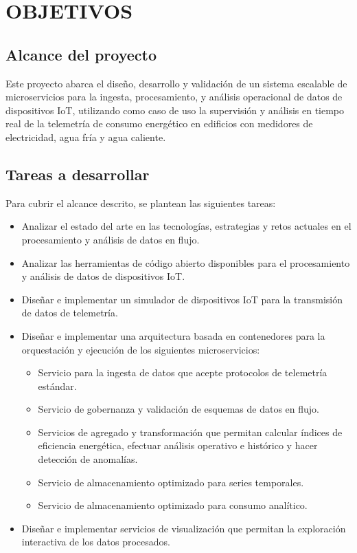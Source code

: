 \chapter{OBJETIVOS}

\section{Alcance del proyecto}

Este proyecto abarca el diseño, desarrollo y validación de un sistema escalable de microservicios para la ingesta, procesamiento, y análisis operacional de datos de dispositivos IoT, utilizando como caso de uso la supervisión y análisis en tiempo real de la telemetría de consumo energético en edificios con medidores de electricidad, agua fría y agua caliente.

\section{Tareas a desarrollar}

Para cubrir el alcance descrito, se plantean las siguientes tareas:

\begin{itemize}
    \item Analizar el estado del arte en las tecnologías, estrategias y retos actuales en el procesamiento y análisis de datos en flujo.
    \item Analizar las herramientas de código abierto disponibles para el procesamiento y análisis de datos de dispositivos IoT.
    \item Diseñar e implementar un simulador de dispositivos IoT para la transmisión de datos de telemetría.
    \item Diseñar e implementar una arquitectura basada en contenedores para la orquestación y ejecución de los siguientes microservicios:
    \begin{itemize}
        \item Servicio para la ingesta de datos que acepte protocolos de telemetría estándar.
        \item Servicio de gobernanza y validación de esquemas de datos en flujo.
        \item Servicios de agregado y transformación que permitan calcular índices de eficiencia energética, efectuar análisis operativo e histórico y hacer detección de anomalías.
        \item Servicio de almacenamiento optimizado para series temporales.
        \item Servicio de almacenamiento optimizado para consumo analítico.
    \end{itemize}
    \item Diseñar e implementar servicios de visualización que permitan la exploración interactiva de los datos procesados.
\end{itemize}


